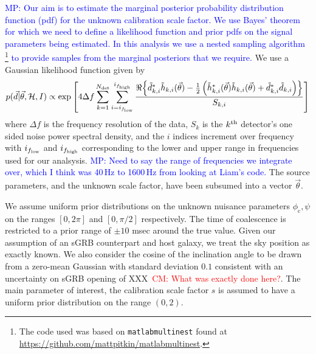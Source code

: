 \documentclass[12pt]{iopart}
\newcommand{\curlH}{\mathcal{H}}
\newcommand{\gws}{\tilde{h}}
\newcommand{\cm}[1]{\textcolor{red}{CM: #1}}
\newcommand{\MP}[1]{\textcolor{blue}{MP: #1}}
\begin{document}
\MP{Our aim is to estimate the marginal posterior probability distribution function (pdf)
for the unknown calibration scale factor. We use Bayes' theorem for which we need to define
a likelihood function and prior pdfs on the signal parameters being estimated. In this
analysis we use a nested sampling algorithm \cite{Skilling}\footnote{The code used was based
on {\tt matlabmultinest} found at \url{https://github.com/mattpitkin/matlabmultinest}.}
to provide samples from the marginal posteriors that we require.}
We use a Gaussian likelihood function given by
%
\begin{equation}
  p(\vec{d} | \vec{\theta}, \curlH, I) \propto \exp{\left[4\Delta f \sum_{k=1}^{N_{\rm det}}
  \sum_{i=i_{f_{\rm low}}}^{i_{f_{\rm high}}}\frac{\Re{\left\{ \tilde{d}^{*}_{k,i} \gws_{k,i}(\vec{\theta})
  - \frac{1}{2}\left(\gws^*_{k,i}(\vec{\theta})\gws_{k,i}(\vec{\theta}) + \tilde{d}^*_{k,i}\tilde{d}_{k,i}\right) \right\}}}{S_{k,i}}\right]}
\end{equation}
% 
where $\Delta f$ is the frequency resolution of the data, $S_k$ is the
$k^{\rm th}$ detector's one sided noise power spectral density, and the $i$ indices
increment over frequency with $i_{f_{\rm low}}$ and $i_{f_{\rm high}}$ corresponding to
the lower and upper range in frequencies used for our
analsysis. \MP{Need to say the
range of frequencies we integrate over, which I think was 40\,Hz to 1600\,Hz from looking
at Liam's code.} The source parameters, and the unknown scale factor, have been subsumed
into a vector $\vec{\theta}$.

We assume uniform prior distributions on the unknown nuisance parameters
$\phi_{\mathrm{c}},\psi$ on the ranges $[0, 2\pi]$ and $[0, \pi/2]$ respectively.
The time of coalescence is
restricted to a prior range of $\pm 10$ msec around the true value.  Given our
assumption of an \ac{sGRB} counterpart and host galaxy, we treat the sky
position as exactly known. We also consider the cosine of the inclination angle to be drawn
from a zero-mean Gaussian with standard deviation $0.1$ consistent with an
uncertainty on \ac{sGRB} opening of XXX~\cm{What was exactly done here?}.  The
main parameter of interest, the calibration scale factor $s$ is assumed to have
a uniform prior distribution on the range $(0,2)$.    
\end{document}
